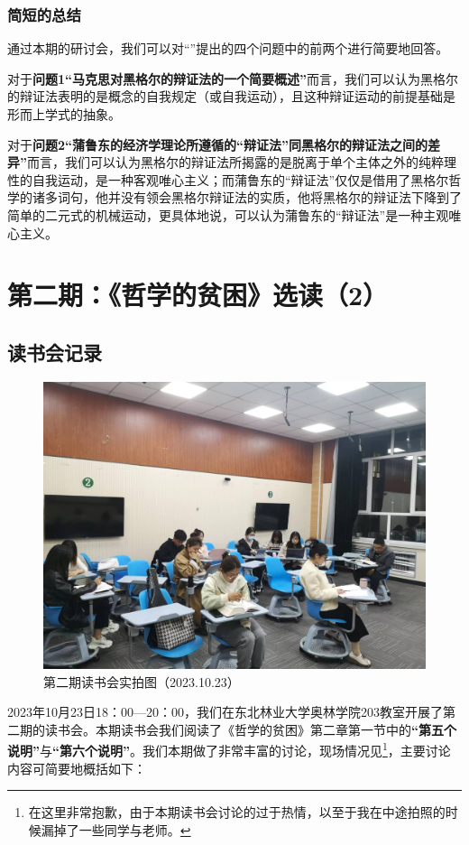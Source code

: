 \documentclass[a4paper,twoside,12pt,AutoFakeBold]{ctexart}
\begin{document}
\subsubsection{简短的总结}

通过本期的研讨会，我们可以对“\textbf{}”提出的四个问题中的前两个进行简要地回答。

对于\textbf{问题1“马克思对黑格尔的辩证法的一个简要概述”}而言，我们可以认为黑格尔的辩证法表明的是概念的自我规定（或自我运动），且这种辩证运动的前提基础是形而上学式的抽象。

对于\textbf{问题2“蒲鲁东的经济学理论所遵循的“辩证法”同黑格尔的辩证法之间的差异”}而言，我们可以认为黑格尔的辩证法所揭露的是脱离于单个主体之外的纯粹理性的自我运动，是一种客观唯心主义；而蒲鲁东的“辩证法”仅仅是借用了黑格尔哲学的诸多词句，他并没有领会黑格尔辩证法的实质，他将黑格尔的辩证法下降到了简单的二元式的机械运动，更具体地说，可以认为蒲鲁东的“辩证法”是一种主观唯心主义。
\newpage

\section{第二期：《哲学的贫困》选读（2）}

\subsection{读书会记录}
\begin{figure}[h]
    \centering
    \includegraphics[width=1\linewidth]{10.23.jpg}
    \caption{第二期读书会实拍图（2023.10.23）}
    \label{fig1}
\end{figure}
2023年10月23日18：00—20：00，我们在东北林业大学奥林学院203教室开展了第二期的读书会。本期读书会我们阅读了《哲学的贫困》第二章第一节中的\textbf{“第五个说明”}与\textbf{“第六个说明”}。我们本期做了非常丰富的讨论，现场情况见\textbf{}\footnote{在这里非常抱歉，由于本期读书会讨论的过于热情，以至于我在中途拍照的时候漏掉了一些同学与老师。}，主要讨论内容可简要地概括如下：
\end{document}

